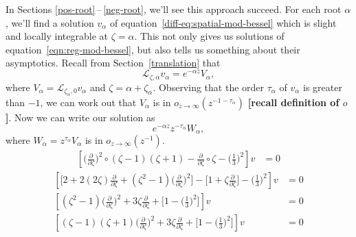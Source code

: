\documentclass{article}
\theoremstyle{plain}
\newcommand{\laplace}{\mathcal{L}}
\newcommand{\fracderiv}[3]{\partial^{#1}_{#2, #3}}
\begin{document}
In Sections \ref{pos-root}\,--\,\ref{neg-root}, we'll see this approach succeed. For each root $\alpha$, we'll find a solution $v_\alpha$ of equation~\ref{diff-eq:spatial-mod-bessel} which is slight and locally integrable at $\zeta = \alpha$. This not only gives us solutions of equation~\ref{eqn:reg-mod-bessel}, but also tells us something about their asymptotics. Recall from Section~\ref{translation} that
\[ \laplace_{\zeta, \alpha} v_\alpha = e^{-\alpha z} V_\alpha, \]
where $V_\alpha = \laplace_{\zeta_\alpha, 0} v_\alpha$ and $\zeta = \alpha + \zeta_\alpha$. Observing that the order $\tau_\alpha$ of $v_\alpha$ is greater than $-1$, we can work out that $V_\alpha$ is in $o_{z \to \infty}(z^{-1-\tau_\alpha})$ \textbf{[recall definition of $o$]}. Now we can write our solution as
\[ e^{-\alpha z} z^{-\tau_\alpha} W_\alpha, \]
where $W_\alpha = z^{\tau_\alpha} V_\alpha$ is in $o_{z \to \infty}(z^{-1})$.
\color{Peru}
\begin{align*}
\left[ \big(\tfrac{\partial}{\partial \zeta}\big)^2 \circ (\zeta - 1)(\zeta + 1) - \tfrac{\partial}{\partial \zeta} \circ \zeta - \big(\tfrac{1}{3}\big)^2 \right] v & = 0
\end{align*}
\color{Sienna}
\begin{align*}
\left[ \big[ 2 + 2(2\zeta) \tfrac{\partial}{\partial \zeta} + (\zeta^2 - 1) \big(\tfrac{\partial}{\partial \zeta}\big)^2 \big] - \big[ 1 + \zeta \tfrac{\partial}{\partial \zeta} \big] - \big(\tfrac{1}{3}\big)^2 \right] v & = 0 \\
\left[ (\zeta^2 - 1) \big(\tfrac{\partial}{\partial \zeta}\big)^2 + 3\zeta \tfrac{\partial}{\partial \zeta} + \big[ 1 - \big(\tfrac{1}{3}\big)^2 \big] \right] v & = 0 \\
\left[ (\zeta - 1)(\zeta + 1) \big(\tfrac{\partial}{\partial \zeta}\big)^2 + 3\zeta \tfrac{\partial}{\partial \zeta} + \big[ 1 - \big(\tfrac{1}{3}\big)^2 \big] \right] v & = 0
\end{align*}
\color{black}
\end{document}
